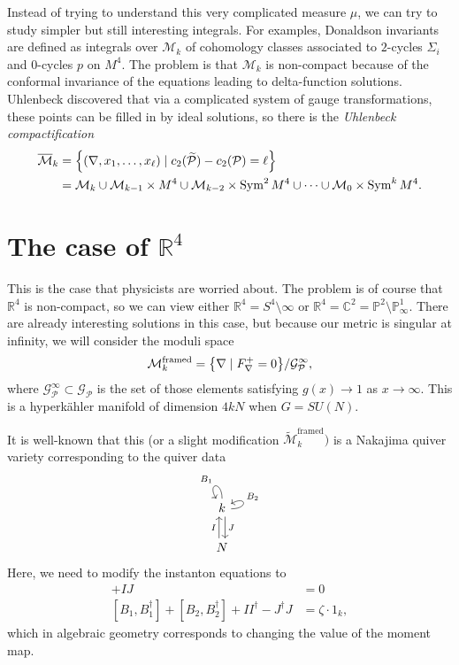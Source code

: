\documentclass[leqno, openany]{memoir}
\theoremstyle{definition}
\theoremstyle{remark}
\theoremstyle{plain}
\theoremstyle{definition}
\theoremstyle{remark}
\newcommand{\R}{\mathbb{R}}
\newcommand{\C}{\mathbb{C}}
\renewcommand{\P}{\mathbb{P}}
\newcommand{\mc}[1]{\mathcal{#1}}
\newcommand{\mr}[1]{\mathrm{#1}}
\newcommand{\on}[1]{\operatorname{#1}}
\newcommand{\ol}[1]{\overline{#1}}
\newcommand{\wt}[1]{\widetilde{#1}}
\begin{document}
Instead of trying to understand this very complicated measure $\mu$, we can try to study simpler but still interesting integrals. For examples, Donaldson invariants are defined as integrals over $\mc{M}_k$ of cohomology classes associated to $2$-cycles $\Sigma_i$ and $0$-cycles $p$ on $M^4$. The problem is that $\mc{M}_k$ is non-compact because of the conformal invariance of the equations leading to delta-function solutions. Uhlenbeck discovered that via a complicated system of gauge transformations, these points can be filled in by ideal solutions, so there is the \textit{Uhlenbeck compactification}
\begin{align*}
    \ol{\mc{M}}_k &= \qty{(\nabla, x_1, \ldots, x_{\ell}) \mid c_2(\wt{\mc{P}}) - c_2(\mc{P}) = \ell} \\
    &= \mc{M}_k \cup \mc{M}_{k-1} \times M^4 \cup \mc{M}_{k-2} \times \on{Sym}^2 M^4 \cup  \cdots \cup \mc{M}_0 \times \on{Sym}^k M^4.
\end{align*}

\section{The case of $\R^4$}

This is the case that physicists are worried about. The problem is of course that $\R^4$ is non-compact, so we can view either $\R^4 = S^4 \setminus \infty$ or $\R^4 = \C^2 = \P^2 \setminus \P^1_{\infty}$. There are already interesting solutions in this case, but because our metric is singular at infinity, we will consider the moduli space
\[ \mc{M}_k^{\mr{framed}} = \qty{\nabla \mid F_{\nabla}^+ = 0} / \mc{G}_{\mc{P}}^{\infty}, \]
where $\mc{G}_{\mc{P}}^{\infty} \subset \mc{G}_{\mc{P}}$ is the set of those elements satisfying $g(x) \to 1$ as $x \to \infty$. This is a hyperk\"ahler manifold of dimension $4kN$ when $G = SU(N)$.

It is well-known that this (or a slight modification $\wt{\mc{M}}_k^{\mr{framed}})$ is a Nakajima quiver variety corresponding to the quiver data
\begin{equation*}
\begin{tikzcd}
    k \ar[shift left=1]{d}{J} \arrow[out=0,in=30,loop,swap,"B_2"] \arrow[out=90,in=120,loop,swap,"B_1"]\\
    N \ar[shift left=1]{u}{I}
\end{tikzcd}
\end{equation*}
Here, we need to modify the instanton equations to
\begin{align*}
    [B_1, B_2] + IJ &= 0 \\
    [B_1, B_1^{\dag}] + [B_2, B_2^{\dag}] + I I^{\dag} - J^{\dag} J &= \zeta \cdot 1_k,
\end{align*}
which in algebraic geometry corresponds to changing the value of the moment map.
\end{document}
